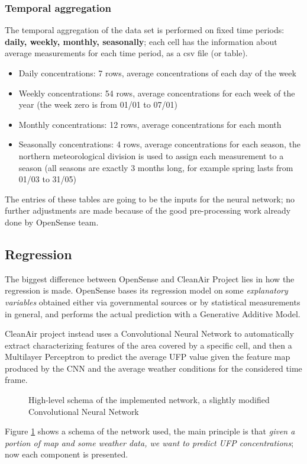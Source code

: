 \documentclass[11pt,a4paper,titlepage]{book}
\begin{document}
\subsubsection{Temporal aggregation}
The temporal aggregation of the data set is performed on fixed time periods: \textbf{daily, weekly, monthly, seasonally}; each cell has the information about average measurements for each time period, as a csv file (or table). 
\begin{itemize}
    \item Daily concentrations: 7 rows, average concentrations of each day of the week
    \item Weekly concentrations: 54 rows, average concentrations for each week of the year (the week zero is from 01/01 to 07/01)
    \item Monthly concentrations: 12 rows, average concentrations for each month
    \item Seasonally concentrations: 4 rows, average concentrations for each season, the northern meteorological division is used to assign each measurement to a season (all seasons are exactly 3 months long, for example spring lasts from 01/03 to 31/05)
\end{itemize}
The entries of these tables are going to be the inputs for the neural network; no further adjustments are made because of the good pre-processing work already done by OpenSense team.
\subsection{Regression}
The biggest difference between OpenSense and CleanAir Project lies in how the regression is made. OpenSense bases its regression model on some \textit{explanatory variables} obtained either via governmental sources or by statistical measurements in general, and performs the actual prediction with a Generative Additive Model.

CleanAir project instead uses a Convolutional Neural Network to automatically extract characterizing features of the area covered by a specific cell, and then a Multilayer Perceptron to predict the average UFP value given the feature map produced by the CNN and the average weather conditions for the considered time frame.
\begin{figure}[ht]
    \centering
    
    \caption{High-level schema of the implemented network, a slightly modified Convolutional Neural Network} 
    \label{cleanair_cnn_schema}
\end{figure}
\newline
\newline
Figure \ref{cleanair_cnn_schema} shows a schema of the network used, the main principle is that \textit{given a portion of map and some weather data, we want to predict UFP concentrations}; now each component is presented.
\end{document}
